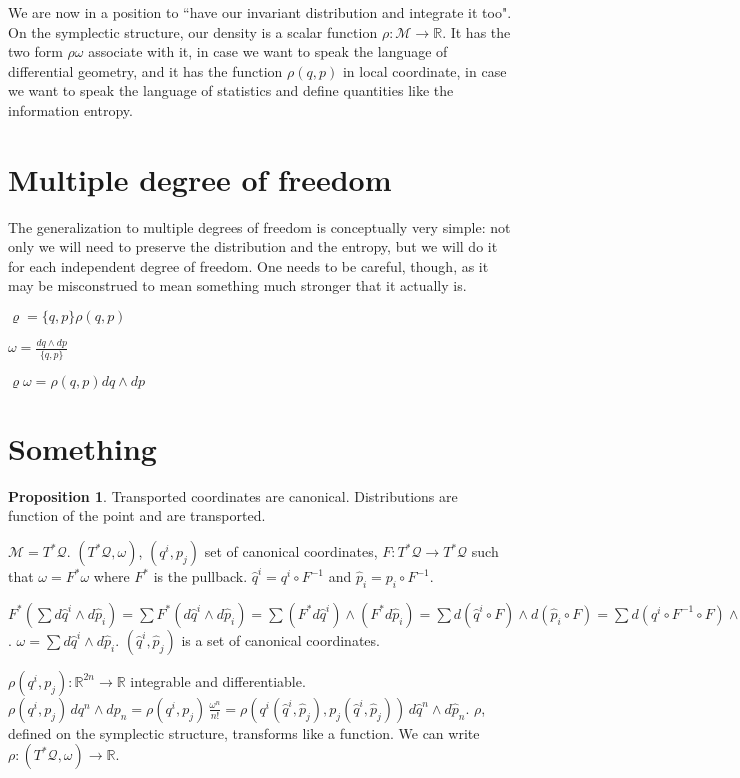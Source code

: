 \documentclass[smallextended]{svjour3}
\numberwithin{equation}{section}
\theoremstyle{definition}
\newtheorem{prop}[equation]{Proposition}
\begin{document}
We are now in a position to ``have our invariant distribution and integrate it too". On the symplectic structure, our density is a scalar function $\rho : \mathcal{M} \rightarrow \mathbb{R}$. It has the two form $\rho \omega$ associate with it, in case we want to speak the language of differential geometry, and it has the function $\rho(q,p)$ in local coordinate, in case we want to speak the language of statistics and define quantities like the information entropy.

\section{Multiple degree of freedom}

The generalization to multiple degrees of freedom is conceptually very simple: not only we will need to preserve the distribution and the entropy, but we will do it for each independent degree of freedom. One needs to be careful, though, as it may be misconstrued to mean something much stronger that it actually is.

$\varrho = \{q,p\} \rho(q,p)$

$\omega = \frac{dq\wedge dp}{\{q,p\}}$

$\varrho \omega = \rho(q,p) dq\wedge dp$


\section{Something}

\begin{prop}
	Transported coordinates are canonical. Distributions are function of the point and are transported.
\end{prop}

$\mathcal{M} = T^*\mathcal{Q}$. $(T^*\mathcal{Q}, \omega)$, $(q^i, p_j)$ set of canonical coordinates, $F: T^*\mathcal{Q} \rightarrow T^*\mathcal{Q}$ such that $\omega = F^* \omega$ where $F^*$ is the pullback. $\hat{q}^i = q^i \circ F^{-1}$ and $\hat{p}_i = p_i \circ F^{-1}$.

$F^* (\sum d\hat{q}^i \wedge d\hat{p}_i) =\sum F^* (d\hat{q}^i \wedge d\hat{p}_i) =  \sum (F^* d\hat{q}^i)\wedge (F^* d\hat{p}_i) = \sum d(\hat{q}^i \circ F)\wedge d(\hat{p}_i \circ F) = \sum d(q^i \circ F^{-1} \circ F)\wedge d(p_i \circ F^{-1} \circ F) = \sum dq^i\wedge dp_i = \omega = F^* \omega$. $\omega =  \sum d\hat{q}^i \wedge d\hat{p}_i$. $(\hat{q}^i, \hat{p}_j)$ is a set of canonical coordinates.

$\rho(q^i, p_j) : \mathbb{R}^{2n} \rightarrow \mathbb{R}$ integrable and differentiable. $\rho (q^i, p_j) \, dq^n \wedge dp_n = \rho (q^i, p_j) \, \frac{\omega^n}{n!} = \rho (q^i(\hat{q}^i, \hat{p}_j), p_j(\hat{q}^i, \hat{p}_j)) \, d\hat{q}^n \wedge d\hat{p}_n$. $\rho$, defined on the symplectic structure, transforms like a function. We can write $\rho : (T^*\mathcal{Q}, \omega) \rightarrow \mathbb{R}$.
\end{document}
